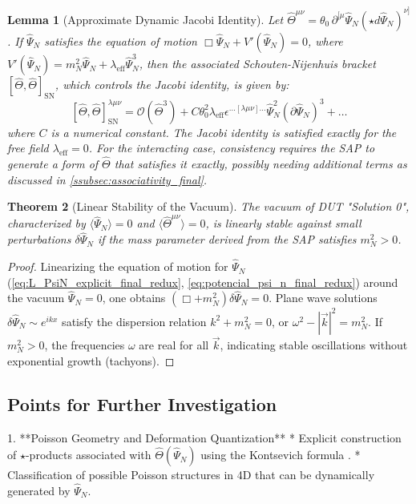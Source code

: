 \documentclass[11pt, a4paper]{article}
\newtheorem{theorem}{Theorem}[section]
\newtheorem{lemma}[theorem]{Lemma} %
\theoremstyle{remark}
\newcommand{\Op}[1]{\hat{#1}}
\begin{document}
\begin{lemma}[Approximate Dynamic Jacobi Identity]
\label{apendice:lema_jacobi}
Let \( \Op{\Theta}^{\mu\nu} = \theta_0 \, \partial^{[\mu} \Op{\Psi}_N (\star d\Op{\Psi}_N)^{\nu]} \). If \( \Op{\Psi}_N \) satisfies the equation of motion \( \Box \Op{\Psi}_N + V'(\Op{\Psi}_N) = 0 \), where \( V'(\Op{\Psi}_N) = m_N^2 \Op{\Psi}_N + \lambda_{\text{eff}} \Op{\Psi}_N^3 \), then the associated Schouten-Nijenhuis bracket \( [\Op{\Theta}, \Op{\Theta}]_{\text{SN}} \), which controls the Jacobi identity, is given by:
\[
[\Op{\Theta}, \Op{\Theta}]_{\text{SN}}^{\lambda\mu\nu} = \mathcal{O}(\Op{\Theta}^3) + C \theta_0^2 \lambda_{\text{eff}} \epsilon^{\dots[\lambda\mu\nu]\dots} \Op{\Psi}_N^2 (\partial \Op{\Psi}_N)^3 + \dots
\]
where \( C \) is a numerical constant. The Jacobi identity is satisfied exactly for the free field \( \lambda_{\text{eff}} = 0 \). For the interacting case, consistency requires the SAP to generate a form of \( \Op{\Theta} \) that satisfies it exactly, possibly needing additional terms as discussed in \cref{ssubsec:associativity_final}.
\end{lemma}

\begin{theorem}[Linear Stability of the Vacuum]
\label{teo:estabilidad_vacio}
The vacuum of DUT "Solution 0", characterized by \( \langle \Op{\Psi}_N \rangle = 0 \) and \( \langle \Op{\Theta}^{\mu\nu} \rangle = 0 \), is linearly stable against small perturbations \( \delta \Op{\Psi}_N \) if the mass parameter derived from the SAP satisfies \( m_N^2 > 0 \).
\end{theorem}
\begin{proof}[Proof]
Linearizing the equation of motion for \( \Op{\Psi}_N \) (\cref{eq:L_PsiN_explicit_final_redux}, \cref{eq:potencial_psi_n_final_redux}) around the vacuum \( \Op{\Psi}_N = 0 \), one obtains \( (\Box + m_N^2)\delta \Op{\Psi}_N = 0 \). Plane wave solutions \( \delta \Op{\Psi}_N \sim e^{ikx} \) satisfy the dispersion relation \( k^2 + m_N^2 = 0 \), or \( \omega^2 - |\vec{k}|^2 = m_N^2 \). If \( m_N^2 > 0 \), the frequencies \( \omega \) are real for all \( \vec{k} \), indicating stable oscillations without exponential growth (tachyons).
\end{proof}

\subsection{Points for Further Investigation}

1.  **Poisson Geometry and Deformation Quantization**
    * Explicit construction of \( \star \)-products associated with \( \Op{\Theta}(\Op{\Psi}_N) \) using the Kontsevich formula \citep{Kontsevich2003Deformation}.
    * Classification of possible Poisson structures in 4D that can be dynamically generated by \( \Op{\Psi}_N \).
\end{document}
